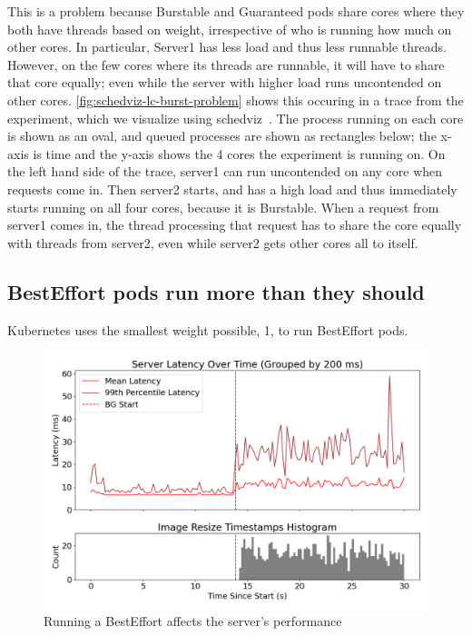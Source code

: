This is a problem because Burstable and Guaranteed pods share cores where they
both have threads based on weight, irrespective of who is running how much on
other cores. In particular, Server1 has less load and thus less runnable
threads. However, on the few cores where its threads are runnable, it will have
to share that core equally; even while the server with higher load runs
uncontended on other cores. \autoref{fig:schedviz-lc-burst-problem} shows this
occuring in a trace from the experiment, which we visualize using
schedviz~\cite{schedviz-tool}. The process running on each core is shown as an
oval, and queued processes are shown as rectangles below; the x-axis is time and
the y-axis shows the 4 cores the experiment is running on. On the left hand side
of the trace, server1 can run uncontended on any core when requests come in.
Then server2 starts, and has a high load and thus immediately starts running on
all four cores, because it is Burstable. When a request from server1 comes in,
the thread processing that request has to share the core equally with threads
from server2, even while server2 gets other cores all to itself.




\subsection{BestEffort pods run more than they should}

Kubernetes uses the smallest weight possible, 1, to run BestEffort pods. 

\begin{figure}[t]
    \centering
    \includegraphics[width=\columnwidth]{graphs/kubernetes-unedited.png}
    \caption{Running a BestEffort affects the server's
    performance}\label{fig:kubernetes-unedited}
\end{figure}

